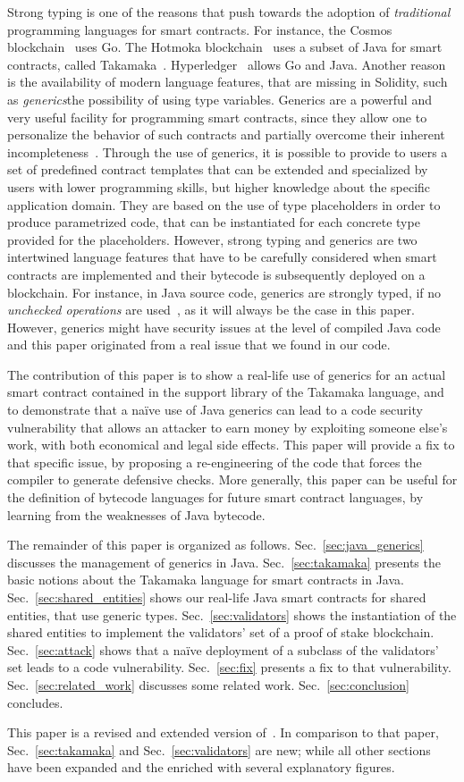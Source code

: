 Strong typing is one of the reasons that push towards the adoption
of \emph{traditional} programming languages for smart contracts. For instance,
the Cosmos blockchain~\cite{cosmos} uses Go. The
Hotmoka blockchain~\cite{hotmoka} uses a subset of Java
for smart contracts, called Takamaka~\cite{Spoto19,Spoto20}.
Hyperledger~\cite{hyperldeger} allows Go and Java.
Another reason is the availability of modern
language features, that are missing in Solidity,
such as \emph{generics}\ie the possibility of using
type variables. Generics are a powerful and very useful facility for programming
smart contracts, since they allow one to personalize the behavior of such contracts and partially overcome their inherent incompleteness~\cite{ebp}. 
%
Through the use of generics, it is possible to provide to users a set of predefined contract templates that can be extended and specialized by users with lower programming skills, but higher knowledge about the specific application domain. They are based on the use of type placeholders in order
to produce parametrized code, that can be instantiated for each
concrete type provided for the placeholders.
%
However, strong typing and generics are two intertwined language features that have to be carefully considered when smart contracts are implemented and their bytecode is subsequently deployed on a blockchain. For instance, in Java source code, generics are strongly typed, if no \emph{unchecked operations} are used~\cite{NaftalinW06}, as it will always be the case in this paper.
However, generics might have security issues at the level of compiled Java code and this paper originated from a real issue that we found in our code.



The contribution of this paper is to show a real-life
use of generics for an actual smart contract contained in the support
library of the Takamaka language, and to demonstrate that a na\"{i}ve use
of Java generics can lead to a code security vulnerability that
allows an attacker to earn money by exploiting someone else's work, with both economical and legal side effects.
This paper will provide a fix to that specific issue,
by proposing a re-engineering of the code that forces the compiler to generate defensive checks.
More generally, this paper can be useful for the definition of
bytecode languages for future smart contract languages, by
learning from the weaknesses of Java bytecode.

The remainder of this paper is organized as follows.
Sec.~\ref{sec:java_generics} discusses the management of generics in Java.
Sec.~\ref{sec:takamaka} presents the basic notions about the Takamaka language for smart contracts in Java.
Sec.~\ref{sec:shared_entities} shows our real-life Java smart
contracts for shared entities, that use generic types.
Sec.~\ref{sec:validators} shows the instantiation of the shared entities to implement the validators' set
of a proof of stake blockchain.
Sec.~\ref{sec:attack} shows that a na\"{i}ve
deployment of a subclass of the validators' set leads to a code vulnerability.
Sec.~\ref{sec:fix} presents a fix to that vulnerability.
Sec.~\ref{sec:related_work} discusses some related work.
Sec.~\ref{sec:conclusion} concludes.

This paper is a revised and extended version of~\cite{BeniniGMS21}.
In comparison to that paper, Sec.~\ref{sec:takamaka} and
Sec.~\ref{sec:validators} are new; while all other sections have been expanded and the enriched with several explanatory figures.
